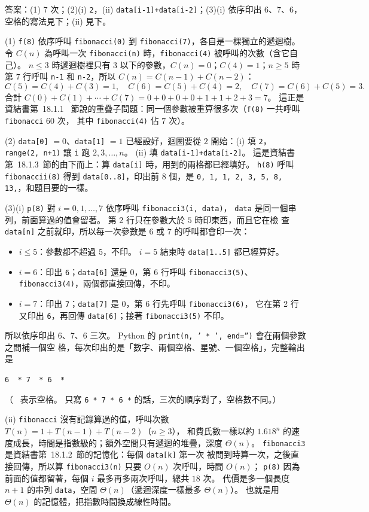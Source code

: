 \begin{pastsoln}
答案：(1) $7$ 次；(2)(i) \texttt{2}，(ii) \texttt{data[i-1]+data[i-2]}；(3)(i) 依序印出 $6$、$7$、$6$，空格的寫法見下；(ii) 見下。

(1) \texttt{f(8)} 依序呼叫 \texttt{fibonacci(0)} 到 \texttt{fibonacci(7)}，各自是一棵獨立的遞迴樹。
令 $C(n)$ 為呼叫一次 \texttt{fibonacci(n)} 時，\texttt{fibonacci(4)} 被呼叫的次數（含它自己）。
$n \le 3$ 時遞迴樹裡只有 $3$ 以下的參數，$C(n) = 0$；$C(4) = 1$；$n \ge 5$ 時第 7 行呼叫
\texttt{n-1} 和 \texttt{n-2}，所以 $C(n) = C(n - 1) + C(n - 2)$：
\[
C(5) = C(4) + C(3) = 1, \quad C(6) = C(5) + C(4) = 2, \quad C(7) = C(6) + C(5) = 3 .
\]
合計 $C(0) + C(1) + \cdots + C(7) = 0 + 0 + 0 + 0 + 1 + 1 + 2 + 3 = 7$。 這正是資結書第~18.1.1~
節說的重疊子問題：同一個參數被重算很多次（\texttt{f(8)} 一共呼叫 \texttt{fibonacci} $60$ 次，
其中 \texttt{fibonacci(4)} 佔 $7$ 次）。

(2) \texttt{data[0]} $= 0$、\texttt{data[1]} $= 1$ 已經設好，迴圈要從 $2$ 開始：(i) 填 \texttt{2}，
\texttt{range(2, n+1)} 讓 \texttt{i} 跑 $2, 3, \ldots, n$。 (ii) 填 \texttt{data[i-1]+data[i-2]}。
這是資結書第~18.1.3~節的由下而上：算 \texttt{data[i]} 時，用到的兩格都已經填好。
\texttt{h(8)} 呼叫 \texttt{fibonaccii(8)} 得到 \texttt{data[0..8]}，印出前 $8$ 個，是
\texttt{0, 1, 1, 2, 3, 5, 8, 13,}，和題目要的一樣。

(3)(i) \texttt{p(8)} 對 $i = 0, 1, \ldots, 7$ 依序呼叫 \texttt{fibonacci3(i, data)}，
\texttt{data} 是同一個串列，前面算過的值會留著。 第 2 行只在參數大於 $5$ 時印東西，而且它在檢
查 \texttt{data[n]} 之前就印，所以每一次參數是 $6$ 或 $7$ 的呼叫都會印一次：
\begin{itemize}
\item $i \le 5$：參數都不超過 $5$，不印。 $i = 5$ 結束時 \texttt{data[1..5]} 都已經算好。
\item $i = 6$：印出 \texttt{6}；\texttt{data[6]} 還是 $0$，第 6 行呼叫 \texttt{fibonacci3(5)}、
\texttt{fibonacci3(4)}，兩個都直接回傳，不印。
\item $i = 7$：印出 \texttt{7}；\texttt{data[7]} 是 $0$，第 6 行先呼叫 \texttt{fibonacci3(6)}，
它在第 2 行又印出 \texttt{6}，再回傳 \texttt{data[6]}；接著 \texttt{fibonacci3(5)} 不印。
\end{itemize}
所以依序印出 6、7、6 三次。 Python 的 \texttt{print(n, ' * ', end='')} 會在兩個參數之間補一個空
格，每次印出的是「數字、兩個空格、星號、一個空格」，完整輸出是
\begin{center}
\verb*|6  * 7  * 6  * |
\end{center}
（\verb*| | 表示空格。 只寫 \texttt{6 * 7 * 6 *} 的話，三次的順序對了，空格數不同。）

(ii) \texttt{fibonacci} 沒有記錄算過的值，呼叫次數 $T(n) = 1 + T(n - 1) + T(n - 2)$（$n \ge 3$），
和費氏數一樣以約 $1.618^n$ 的速度成長，時間是指數級的；額外空間只有遞迴的堆疊，深度
$\Theta(n)$。 \texttt{fibonacci3} 是資結書第~18.1.2~節的記憶化：每個 \texttt{data[k]} 第一次
被問到時算一次，之後直接回傳，所以算 \texttt{fibonacci3(n)} 只要 $O(n)$ 次呼叫，時間 $O(n)$；
\texttt{p(8)} 因為前面的值都留著，每個 $i$ 最多再多兩次呼叫，總共 $18$ 次。 代價是多一個長度
$n + 1$ 的串列 \texttt{data}，空間 $\Theta(n)$（遞迴深度一樣最多 $\Theta(n)$）。 也就是用
$\Theta(n)$ 的記憶體，把指數時間換成線性時間。
\end{pastsoln}
